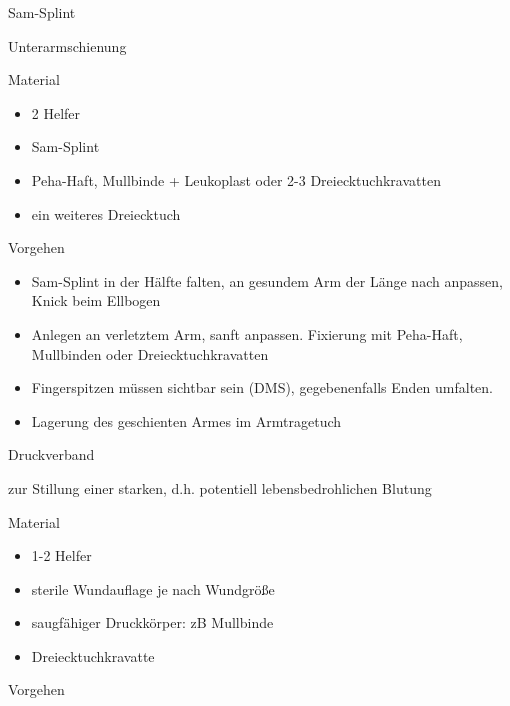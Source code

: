 \documentclass{article}
\begin{document}
Sam-Splint

Unterarmschienung

Material

\begin{itemize}
\item 2 Helfer

\item Sam-Splint

\item Peha-Haft, Mullbinde + Leukoplast oder 2-3 Dreiecktuchkravatten

\item ein weiteres Dreiecktuch

\end{itemize}
Vorgehen

\begin{itemize}
\item Sam-Splint in der H\"alfte falten, an gesundem Arm der L\"ange
nach anpassen, Knick beim Ellbogen

\item Anlegen an verletztem Arm, sanft anpassen. Fixierung mit
Peha-Haft, Mullbinden oder Dreiecktuchkravatten

\item Fingerspitzen m\"ussen sichtbar sein (DMS), gegebenenfalls Enden
umfalten.

\item Lagerung des geschienten Armes im Armtragetuch

\end{itemize}
Druckverband

zur Stillung einer starken, d.h. potentiell lebensbedrohlichen Blutung

Material

\begin{itemize}
\item 1-2 Helfer

\item sterile Wundauflage je nach Wundgr\"o{\ss}e

\item saugf\"ahiger Druckk\"orper: zB Mullbinde

\item Dreiecktuchkravatte

\end{itemize}
Vorgehen
\end{document}
